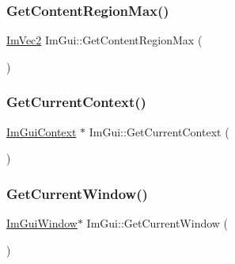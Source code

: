 \hypertarget{namespace_im_gui_a0a4dbfabbfa45d74319ef541962ce2eb}{}\label{namespace_im_gui_a0a4dbfabbfa45d74319ef541962ce2eb} 
\subsubsection{\texorpdfstring{Get\+Content\+Region\+Max()}{GetContentRegionMax()}}
{\footnotesize\ttfamily \hyperlink{struct_im_vec2}{Im\+Vec2} Im\+Gui\+::\+Get\+Content\+Region\+Max (\begin{DoxyParamCaption}{ }\end{DoxyParamCaption})}

\hypertarget{namespace_im_gui_af557a6de5538099a0f6047eb994bbf42}{}\label{namespace_im_gui_af557a6de5538099a0f6047eb994bbf42} 
\subsubsection{\texorpdfstring{Get\+Current\+Context()}{GetCurrentContext()}}
{\footnotesize\ttfamily \hyperlink{struct_im_gui_context}{Im\+Gui\+Context} $\ast$ Im\+Gui\+::\+Get\+Current\+Context (\begin{DoxyParamCaption}{ }\end{DoxyParamCaption})}

\hypertarget{namespace_im_gui_a7ceba68eca2b09fb6bf1ad88037e6203}{}\label{namespace_im_gui_a7ceba68eca2b09fb6bf1ad88037e6203} 
\subsubsection{\texorpdfstring{Get\+Current\+Window()}{GetCurrentWindow()}}
{\footnotesize\ttfamily \hyperlink{struct_im_gui_window}{Im\+Gui\+Window}$\ast$ Im\+Gui\+::\+Get\+Current\+Window (\begin{DoxyParamCaption}{ }\end{DoxyParamCaption})}

\hypertarget{namespace_im_gui_a408f9ddac92f8629a7e273ced5f8c3aa}{}\label{namespace_im_gui_a408f9ddac92f8629a7e273ced5f8c3aa} 
